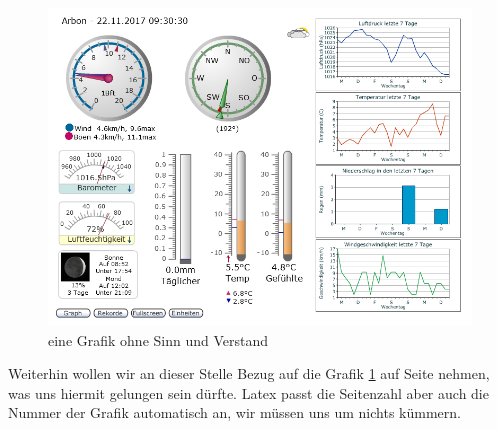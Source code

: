 

\begin{figure}[htbp]
	\centering
	\includegraphics[width=0.9\linewidth]{img/grafik}
	\caption{eine Grafik ohne Sinn und Verstand}
	\label{img:grafik-dummy}
\end{figure}

Weiterhin wollen wir an dieser Stelle Bezug auf die Grafik
\ref{img:grafik-dummy} auf Seite \pageref{img:grafik-dummy} nehmen, was uns
hiermit gelungen sein dürfte. Latex passt die Seitenzahl aber auch die Nummer
der Grafik automatisch an, wir müssen uns um nichts kümmern.